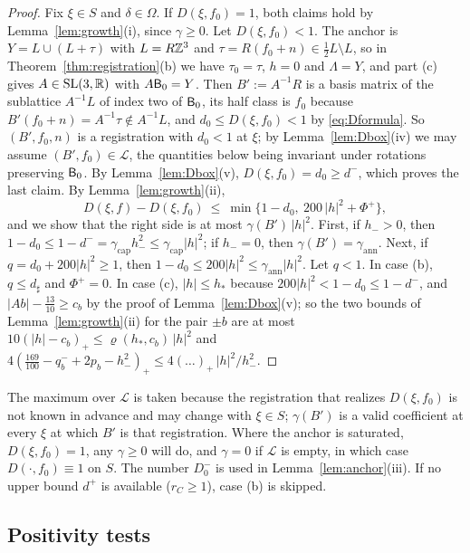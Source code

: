 \begin{proof}
Fix $\xi\in S$ and $\delta\in\Omega$. If $D(\xi,f_0)=1$, both claims hold by Lemma~\ref{lem:growth}(i), since $\gamma\ge0$. Let
$D(\xi,f_0)<1$. The anchor is $Y=L\cup(L+\tau)$ with $L=R\mathbb Z^3$ and $\tau=R(f_0+n)\in\frac12L\setminus L$, so in
Theorem~\ref{thm:registration}(b) we have $\tau_0=\tau$, $h=0$ and $\Lambda=Y$, and part (c) gives $A\in\mathrm{SL}(3,\mathbb R)$ with $A\mathsf B_0=Y$. Then
$B':=A^{-1}R$ is a basis
matrix of the sublattice $A^{-1}L$ of index two of $\mathsf B_0$, its half class is $f_0$ because $B'(f_0+n)=A^{-1}\tau\notin A^{-1}L$, and
$d_0\le D(\xi,f_0)<1$ by \eqref{eq:Dformula}. So $(B',f_0,n)$ is a registration with $d_0<1$ at $\xi$; by Lemma~\ref{lem:Dbox}(iv) we
may assume $(B',f_0)\in\mathcal L$, the quantities below being invariant under rotations preserving $\mathsf B_0$. By
Lemma~\ref{lem:Dbox}(v), $D(\xi,f_0)=d_0\ge d^-$, which proves the last claim. By Lemma~\ref{lem:growth}(ii),
\begin{equation}\label{eq:det-growth}
  D(\xi,f)-D(\xi,f_0)\ \le\ \min\bigl\{1-d_0,\ 200\,|h|^2+\Phi^+\bigr\},
\end{equation}
and we show that the right side is at most $\gamma(B')\,|h|^2$. First, if $h_->0$, then
$1-d_0\le1-d^-=\gamma_{\mathrm{cap}}h_-^2\le\gamma_{\mathrm{cap}}|h|^2$; if $h_-=0$, then $\gamma(B')=\gamma_{\mathrm{ann}}$.
Next, if $q=d_0+200|h|^2\ge1$, then $1-d_0\le200|h|^2\le\gamma_{\mathrm{ann}}|h|^2$. Let $q<1$. In case (b), $q\le d_\sharp$ and
$\Phi^+=0$. In case (c), $|h|\le h_*$ because $200|h|^2<1-d_0\le1-d^-$, and $|Ab|-\frac{13}{10}\ge c_b$ by the proof of
Lemma~\ref{lem:Dbox}(v); so the two bounds of Lemma~\ref{lem:growth}(ii) for the pair $\pm b$ are at most
$10(|h|-c_b)_+\le\varrho(h_*,c_b)\,|h|^2$ and $4(\frac{169}{100}-q_b^-+2p_b-h_-^2)_+\le4(\ldots)_+\,|h|^2/h_-^2$.
\end{proof}

The maximum over $\mathcal L$ is taken because the registration that realizes $D(\xi,f_0)$ is not known in advance and may change
with $\xi\in S$; $\gamma(B')$ is a valid coefficient at every $\xi$ at which $B'$ is that registration. Where the anchor is
saturated, $D(\xi,f_0)=1$, any $\gamma\ge0$ will do, and $\gamma=0$ if $\mathcal L$ is empty, in which case $D(\cdot,f_0)\equiv1$ on
$S$. The number $D_0^-$ is used in Lemma~\ref{lem:anchor}(iii). If no upper bound $d^+$ is available ($r_C\ge1$), case (b) is
skipped.

\subsection{Positivity tests}\label{ssec:det-positive}

